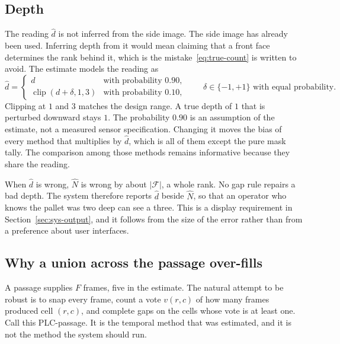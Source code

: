 \subsection{Depth}
\label{sec:plc-depth}

The reading $\hat{d}$ is not inferred from the side image. The side image has already been used. Inferring depth from it would mean claiming that a front face determines the rank behind it, which is the mistake~\eqref{eq:true-count} is written to avoid. The estimate models the reading as
\begin{equation}
\hat{d} =
\begin{cases}
d & \text{with probability } 0.90,\\
\operatorname{clip}(d+\delta,1,3) & \text{with probability } 0.10,
\end{cases}
\qquad
\delta\in\{-1,+1\}
\text{ with equal probability.}
\label{eq:depth}
\end{equation}
Clipping at $1$ and $3$ matches the design range. A true depth of $1$ that is perturbed downward stays $1$. The probability $0.90$ is an assumption of the estimate, not a measured sensor specification. Changing it moves the bias of every method that multiplies by $\hat{d}$, which is all of them except the pure mask tally. The comparison among those methods remains informative because they share the reading.

When $\hat{d}$ is wrong, $\hat{N}$ is wrong by about $\lvert\mathcal{F}\rvert$, a whole rank. No gap rule repairs a bad depth. The system therefore reports $\hat{d}$ beside $\hat{N}$, so that an operator who knows the pallet was two deep can see a three. This is a display requirement in Section~\ref{sec:sys-output}, and it follows from the size of the error rather than from a preference about user interfaces.

\subsection{Why a union across the passage over-fills}
\label{sec:plc-passage}

A passage supplies $F$ frames, five in the estimate. The natural attempt to be robust is to snap every frame, count a vote $v(r,c)$ of how many frames produced cell $(r,c)$, and complete gaps on the cells whose vote is at least one. Call this PLC-passage. It is the temporal method that was estimated, and it is not the method the system should run.

